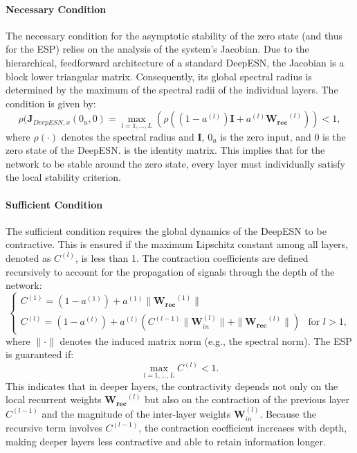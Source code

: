 \paragraph{Necessary Condition}
The necessary condition for the asymptotic stability of the zero state (and thus for the ESP) relies on the analysis of the system's Jacobian. 
Due to the hierarchical, feedforward architecture of a standard DeepESN, the Jacobian is a block lower triangular matrix.
 Consequently, its global spectral radius is determined by the maximum of the spectral radii of the individual layers.
  The condition is given by:
\begin{equation}
    \rho(\mathbf{J}_{DeepESN, x}(0_u, 0)
     = \max_{l=1,\dots,L} \left( \rho \left( (1-a^{(l)})\mathbf{I} + a^{(l)}\mathbf{W_{rec}}^{(l)} \right) \right) < 1,
\end{equation}
where $\rho(\cdot)$ denotes the spectral radius and $\mathbf{I}$, $0_u$ is the zero input, and $0$ is the zero state of the DeepESN.
 is the identity matrix. This implies that for the network to be stable around 
 the zero state, every layer must individually satisfy the local stability criterion.

\paragraph{Sufficient Condition}
The sufficient condition requires the global dynamics of the DeepESN to be contractive. This is ensured if the maximum Lipschitz constant among all layers, denoted as $C^{(l)}$, is less than 1. The contraction coefficients are defined recursively to account for the propagation of signals through the depth of the network:
\begin{equation}
    \begin{cases}
        C^{(1)} = (1-a^{(1)}) + a^{(1)} \|\mathbf{W_{rec}}^{(1)}\| \\
        C^{(l)} = (1-a^{(l)}) + a^{(l)} \left( C^{(l-1)} \|\mathbf{W}_{in}^{(l)}\| + \|\mathbf{W_{rec}}^{(l)}\| \right) & \text{for } l > 1,
    \end{cases}
\end{equation}
where $\|\cdot\|$ denotes the induced matrix norm (e.g., the spectral norm). The ESP is guaranteed if:
\begin{equation}
    \max_{l=1,\dots,L} C^{(l)} < 1.
\end{equation}
This indicates that in deeper layers, the contractivity depends not only on the local recurrent weights $\mathbf{W_{rec}}^{(l)}$ but also on the contraction of the previous layer $C^{(l-1)}$ and the magnitude of the inter-layer weights $\mathbf{W}_{in}^{(l)}$.
\newline
Because the recursive term involves $C^{(l-1)}$, the contraction coefficient increases with depth, making deeper layers less contractive and able to retain information longer.

